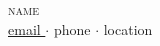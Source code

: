 \begin{center}
    {\Huge \scshape {{ name }}}\\[-2pt]
    \small
    \href{mailto:{{ email }}}{{ email }}\enspace$\cdot$\enspace
    {{ phone }}\enspace$\cdot$\enspace
    {{ location }}
\end{center}
\vspace{-4pt} 